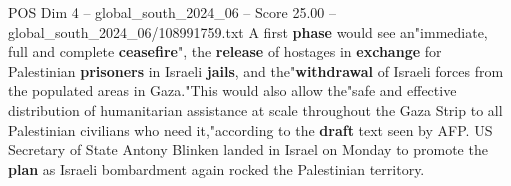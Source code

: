 \begin{textsample}{POS Dim 4 – global\_south\_2024\_06 – Score 25.00 – global\_south\_2024\_06/108991759.txt}
A first \textbf{phase} would see an"immediate, full and complete \textbf{ceasefire}", the \textbf{release} of hostages in \textbf{exchange} for Palestinian \textbf{prisoners} in Israeli \textbf{jails}, and the"\textbf{withdrawal} of Israeli forces from the populated areas in Gaza."This would also allow the"safe and effective distribution of humanitarian assistance at scale throughout the Gaza Strip to all Palestinian civilians who need it,"according to the \textbf{draft} text seen by AFP.
US Secretary of State Antony Blinken landed in Israel on Monday to promote the \textbf{plan} as Israeli bombardment again rocked the Palestinian territory.

\end{textsample}
